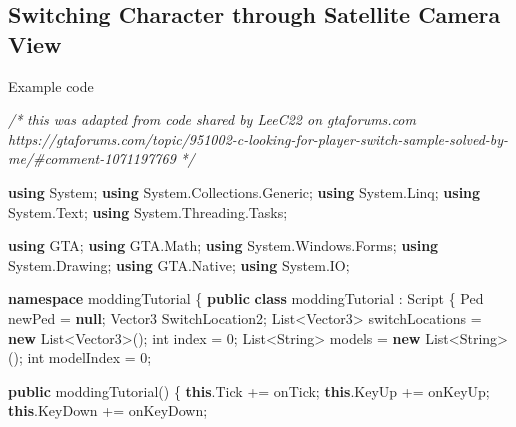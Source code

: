 \documentclass[
  openany]{book}
\newenvironment{Shaded}{\begin{snugshade}}{\end{snugshade}}
\newcommand{\CommentTok}[1]{\textcolor[rgb]{0.56,0.35,0.01}{\textit{#1}}}
\newcommand{\DataTypeTok}[1]{\textcolor[rgb]{0.13,0.29,0.53}{#1}}
\newcommand{\DecValTok}[1]{\textcolor[rgb]{0.00,0.00,0.81}{#1}}
\newcommand{\FunctionTok}[1]{\textcolor[rgb]{0.00,0.00,0.00}{#1}}
\newcommand{\KeywordTok}[1]{\textcolor[rgb]{0.13,0.29,0.53}{\textbf{#1}}}
\newcommand{\NormalTok}[1]{#1}
\begin{document}
\hypertarget{switching-character-through-satellite-camera-view}{%
\subsection*{Switching Character through Satellite Camera View}\label{switching-character-through-satellite-camera-view}}

Example code

\begin{Shaded}
\begin{Highlighting}[]
    
\CommentTok{/*}
\CommentTok{    this was adapted from code shared by LeeC22 on gtaforums.com}
\CommentTok{    https://gtaforums.com/topic/951002-c-looking-for-player-switch-sample-solved-by-me/#comment-1071197769}
\CommentTok{*/}
    
\KeywordTok{using}\NormalTok{ System;}
\KeywordTok{using}\NormalTok{ System.}\FunctionTok{Collections}\NormalTok{.}\FunctionTok{Generic}\NormalTok{;}
\KeywordTok{using}\NormalTok{ System.}\FunctionTok{Linq}\NormalTok{;}
\KeywordTok{using}\NormalTok{ System.}\FunctionTok{Text}\NormalTok{;}
\KeywordTok{using}\NormalTok{ System.}\FunctionTok{Threading}\NormalTok{.}\FunctionTok{Tasks}\NormalTok{;}

\KeywordTok{using}\NormalTok{ GTA;}
\KeywordTok{using}\NormalTok{ GTA.}\FunctionTok{Math}\NormalTok{;}
\KeywordTok{using}\NormalTok{ System.}\FunctionTok{Windows}\NormalTok{.}\FunctionTok{Forms}\NormalTok{;}
\KeywordTok{using}\NormalTok{ System.}\FunctionTok{Drawing}\NormalTok{;}
\KeywordTok{using}\NormalTok{ GTA.}\FunctionTok{Native}\NormalTok{;}
\KeywordTok{using}\NormalTok{ System.}\FunctionTok{IO}\NormalTok{;}


\KeywordTok{namespace}\NormalTok{ moddingTutorial}
\NormalTok{\{}
    \KeywordTok{public} \KeywordTok{class}\NormalTok{ moddingTutorial : Script}
\NormalTok{    \{}
\NormalTok{        Ped newPed = }\KeywordTok{null}\NormalTok{;}
\NormalTok{        Vector3 SwitchLocation2;}
\NormalTok{        List<Vector3> switchLocations = }\KeywordTok{new}\NormalTok{ List<Vector3>();}
        \DataTypeTok{int}\NormalTok{ index = }\DecValTok{0}\NormalTok{;}
\NormalTok{        List<String> models = }\KeywordTok{new}\NormalTok{ List<String>();}
        \DataTypeTok{int}\NormalTok{ modelIndex = }\DecValTok{0}\NormalTok{;}

        \KeywordTok{public} \FunctionTok{moddingTutorial}\NormalTok{()}
\NormalTok{        \{}
            \KeywordTok{this}\NormalTok{.}\FunctionTok{Tick}\NormalTok{ += onTick;}
            \KeywordTok{this}\NormalTok{.}\FunctionTok{KeyUp}\NormalTok{ += onKeyUp;}
            \KeywordTok{this}\NormalTok{.}\FunctionTok{KeyDown}\NormalTok{ += onKeyDown;}


\end{Highlighting}
\end{Shaded}
\end{document}
